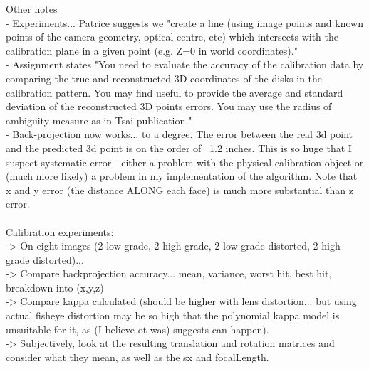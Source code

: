 Other notes\\
- Experiments... Patrice suggests we "create a line (using image points and known points of the camera geometry, optical centre, etc) which intersects with the calibration plane in a given point (e.g. Z=0 in world coordinates)."\\
- Assignment states "You need to evaluate the accuracy of the calibration data by comparing the true and reconstructed 3D coordinates of the disks in the calibration pattern. You may find useful to provide the average and standard deviation of the reconstructed 3D points errors. You may use the radius of ambiguity measure as in Tsai publication."\\
- Back-projection now works... to a degree. The error between the real 3d point and the predicted 3d point is on the order of ~1.2 inches. This is so huge that I suspect systematic error - either a problem with the physical calibration object or (much more likely) a problem in my implementation of the algorithm. Note that x and y error (the distance ALONG each face) is much more substantial than z error.\\
\\
Calibration experiments:\\
-> On eight images (2 low grade, 2 high grade, 2 low grade distorted, 2 high grade distorted)...\\
-> Compare backprojection accuracy... mean, variance, worst hit, best hit, breakdown into (x,y,z) \\
-> Compare kappa calculated (should be higher with lens distortion... but using actual fisheye distortion may be so high that the polynomial kappa model is unsuitable for it, as \cite{straightlines} (I believe ot was) suggests can happen).\\
-> Subjectively, look at the resulting translation and rotation matrices and consider what they mean, as well as the sx and focalLength.\\

